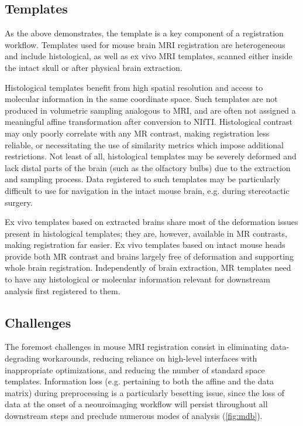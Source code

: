\subsection{Templates}
As the above demonstrates, the template is a key component of a registration workflow.
Templates used for mouse brain MRI registration are heterogeneous and include histological, as well as ex vivo MRI templates, scanned either inside the intact skull or after physical brain extraction.

Histological templates benefit from high spatial resolution and access to molecular information in the same coordinate space.
Such templates are not produced in volumetric sampling analogous to MRI, and are often not assigned a meaningful affine transformation after conversion to NIfTI.
Histological contrast may only poorly correlate with any MR contrast, making registration less reliable, or necessitating the use of similarity metrics which impose additional restrictions.
Not least of all, histological templates may be severely deformed and lack distal parts of the brain (such as the olfactory bulbs) due to the extraction and sampling process.
Data registered to such templates may be particularly difficult to use for navigation in the intact mouse brain, e.g. during stereotactic surgery.

Ex vivo templates based on extracted brains share most of the deformation issues present in histological templates;
they are, however, available in MR contrasts, making registration far easier.
Ex vivo templates based on intact mouse heads provide both MR contrast and brains largely free of deformation and supporting whole brain registration.
Independently of brain extraction, MR templates need to have any histological or molecular information relevant for downstream analysis first registered to them.

\subsection{Challenges}
The foremost challenges in mouse MRI registration consist in eliminating data-degrading workarounds, reducing reliance on high-level interfaces with inappropriate optimizations, and reducing the number of standard space templates.
Information loss (e.g. pertaining to both the affine and the data matrix) during preprocessing is a particularly besetting issue, since the loss of data at the onset of a neouroimaging workflow will persist throughout all downstream steps and preclude numerous modes of analysis (\cref{fig:mdb}).
